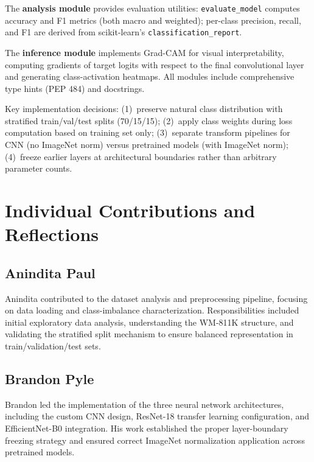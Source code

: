 \documentclass[conference]{IEEEtran}
\begin{document}
The \textbf{analysis module} provides evaluation utilities: \texttt{evaluate\_model}
computes accuracy and F1 metrics (both macro and weighted); per-class precision,
recall, and F1 are derived from scikit-learn's \texttt{classification\_report}.

The \textbf{inference module} implements Grad-CAM for visual interpretability,
computing gradients of target logits with respect to the final convolutional
layer and generating class-activation heatmaps. All modules include comprehensive
type hints (PEP 484) and docstrings.

Key implementation decisions: (1)~preserve natural class distribution with
stratified train/val/test splits (70/15/15); (2)~apply class weights during
loss computation based on training set only; (3)~separate transform pipelines
for CNN (no ImageNet norm) versus pretrained models (with ImageNet norm);
(4)~freeze earlier layers at architectural boundaries rather than arbitrary
parameter counts.

\section*{Individual Contributions and Reflections}
\label{sec:contributions}

\subsection*{Anindita Paul}
Anindita contributed to the dataset analysis and preprocessing pipeline,
focusing on data loading and class-imbalance characterization. Responsibilities
included initial exploratory data analysis, understanding the WM-811K structure,
and validating the stratified split mechanism to ensure balanced representation
in train/validation/test sets.

\subsection*{Brandon Pyle}
Brandon led the implementation of the three neural network architectures,
including the custom CNN design, ResNet-18 transfer learning configuration, and
EfficientNet-B0 integration. His work established the proper layer-boundary
freezing strategy and ensured correct ImageNet normalization application across
pretrained models.
\end{document}
